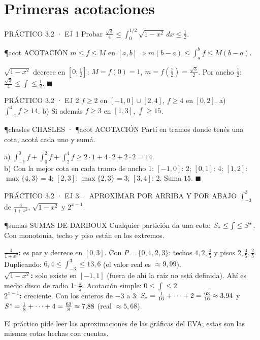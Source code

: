 \section{Primeras acotaciones}

\begin{enunciado}{PRÁCTICO 3.2 · EJ 1}
Probar $\frac{\sqrt3}4\le\int_0^{1/2}\sqrt{1-x^2}\,dx\le\frac12$.
\end{enunciado}
\begin{uso}{\P{acot} ACOTACIÓN}
$m\le f\le M$ en $[a,b]\Rightarrow m(b-a)\le\int_a^bf\le M(b-a)$.
\end{uso}
$\sqrt{1-x^2}$ decrece en $[0,\frac12]$: $M=f(0)=1$, $m=f(\frac12)=\frac{\sqrt3}2$. Por ancho $\frac12$: $\frac{\sqrt3}4\le\int\le\frac12$. $\blacksquare$

\begin{enunciado}{PRÁCTICO 3.2 · EJ 2}
$f\ge2$ en $[-1,0]\cup[2,4]$, $f\ge4$ en $[0,2]$. a) $\int_{-1}^4f\ge14$. b) Si además $f\ge3$ en $[1,3]$, $\int\ge15$.
\end{enunciado}
\begin{uso}{\P{chasles} CHASLES · \P{acot} ACOTACIÓN}
Partí en tramos donde tenés una cota, acotá cada uno y sumá.
\end{uso}
a) $\int_{-1}^0f+\int_0^2f+\int_2^4f\ge2\cdot1+4\cdot2+2\cdot2=14$.\\
b) Con la mejor cota en cada tramo de ancho 1: $[-1,0]$: 2; $[0,1]$: 4; $[1,2]$: $\max\{4,3\}=4$; $[2,3]$: $\max\{2,3\}=3$; $[3,4]$: 2. Suma $15$. $\blacksquare$

\begin{enunciado}{PRÁCTICO 3.2 · EJ 3 · APROXIMAR POR ARRIBA Y POR ABAJO}
$\int_{-3}^3$ de $\frac4{1+x^2}$, $\sqrt{1-x^2}$ y $2^{x-1}$.
\end{enunciado}
\begin{uso}{\P{sumas} SUMAS DE DARBOUX}
Cualquier partición da una cota: $S_{*}\le\int\le S^{*}$. Con monotonía, techo y piso están en los extremos.
\end{uso}
\textbf{$\frac4{1+x^2}$:} es par y decrece en $[0,3]$. Con $P=\{0,1,2,3\}$: techos $4,2,\frac45$ y pisos $2,\frac45,\frac25$. Duplicando: $6{,}4\le\int_{-3}^3\le13{,}6$ (el valor real es $\approx9{,}99$).\\
\textbf{$\sqrt{1-x^2}$:} solo existe en $[-1,1]$ (fuera de ahí la raíz no está definida). Ahí es medio disco de radio 1: $\frac\pi2$. Acotación simple: $0\le\int\le2$.\\
\textbf{$2^{x-1}$:} creciente. Con los enteros de $-3$ a 3: $S_{*}=\frac1{16}+\dots+2=\frac{63}{16}\approx3{,}94$ y $S^{*}=\frac18+\dots+4=\frac{63}8\approx7{,}88$ (real $\approx5{,}68$).
\begin{falta}
El práctico pide leer las aproximaciones de las gráficas del EVA; estas son las mismas cotas hechas con cuentas.
\end{falta}

